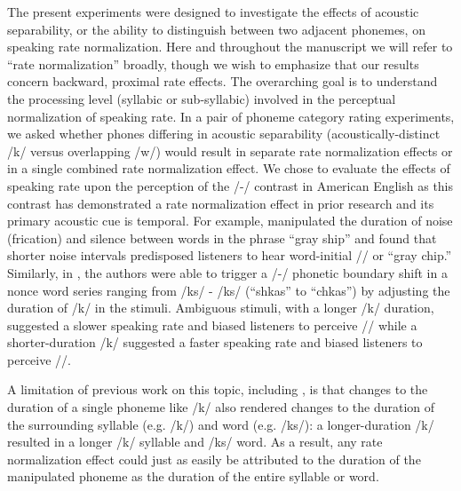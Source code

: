 \documentclass[preprint]{JASA}
\begin{document}
The present experiments were designed to investigate the effects of acoustic separability, or the ability to distinguish between two adjacent phonemes, on speaking rate normalization. Here and throughout the manuscript we will refer to ``rate normalization'' broadly, though we wish to emphasize that our results concern backward, proximal rate effects. The overarching goal is to understand the processing level (syllabic or sub-syllabic) involved in the perceptual normalization of speaking rate. In a pair of phoneme category rating experiments, we asked whether phones differing in acoustic separability (acoustically-distinct /k\textscripta/ versus overlapping /w\textsci/) would result in separate rate normalization effects or in a single combined rate normalization effect. We chose to evaluate the effects of speaking rate upon the perception of the /\textesh -\textteshlig/ contrast in American English as this contrast has demonstrated a rate normalization effect in prior research \citep{newmanPerceptualNormalizationSpeaking1996,reppPerceptualIntegrationAcoustic1978} and its primary acoustic cue is temporal. For example, \citet{reppPerceptualIntegrationAcoustic1978} manipulated the duration of noise (frication) and silence between words in the phrase ``gray ship'' and found that shorter noise intervals predisposed listeners to hear word-initial /\textteshlig/ or ``gray chip.'' Similarly, in \citet{newmanPerceptualNormalizationSpeaking1996}, the authors were able to trigger a /\textesh-\textteshlig/ phonetic boundary shift in a nonce word series ranging from /\textesh k\textscripta s/ - /\textteshlig k\textscripta s/ (``shkas'' to ``chkas'') by adjusting the duration of /k/ in the stimuli. Ambiguous stimuli, with a longer /k/ duration, suggested a slower speaking rate and biased listeners to perceive /\textteshlig/ while a shorter-duration /k/ suggested a faster speaking rate and biased listeners to perceive /\textesh/. 

A limitation of previous work on this topic, including \citet{newmanPerceptualNormalizationSpeaking1996}, is that changes to the duration of a single phoneme like /k/ also rendered changes to the duration of the surrounding syllable (e.g. /k\textscripta/) and word (e.g. /\textesh k\textscripta s/): a longer-duration /k/ resulted in a longer /k\textscripta/ syllable and /\textesh k\textscripta s/ word. As a result, any rate normalization effect could just as easily be attributed to the duration of the manipulated phoneme as the duration of the entire syllable or word.
\end{document}
